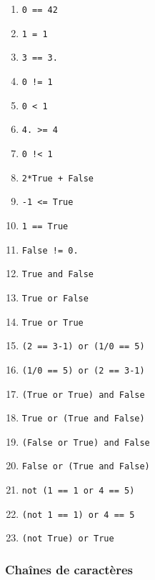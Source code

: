 \begin{multicols}{2}

\begin{multicols}{2}
  \begin{enumerate}[label=\emph{\alph*)}]
    \item \texttt{0 == 42}
    \item \texttt{1 = 1}
    \item \texttt{3 == 3.}
    \item \texttt{0 != 1}
    \item \texttt{0 < 1}
    \item \texttt{4. >= 4}
    \item \texttt{0 !< 1}
    \item \texttt{2*True + False}
    \item \texttt{-1 <= True}
    \item \texttt{1 == True}
    \item \texttt{False != 0.}
    \item \texttt{True and False}
    \item \texttt{True or False}
    \item \texttt{True or True}
    \item \texttt{(2 == 3-1) or (1/0 == 5)}
    \item \texttt{(1/0 == 5) or (2 == 3-1)}
    \item \texttt{(True or True) and False}
    \item \texttt{True or (True and False)}
    \item \texttt{(False or True) and False}    
    \item \texttt{False or (True and False)}    
    \item \texttt{not (1 == 1 or 4 == 5)}
    \item \texttt{(not 1 == 1) or 4 == 5}
    \item \texttt{(not True) or True}
  \end{enumerate}
\end{multicols}

\subsubsection*{Chaînes de caractères}



\end{multicols}
